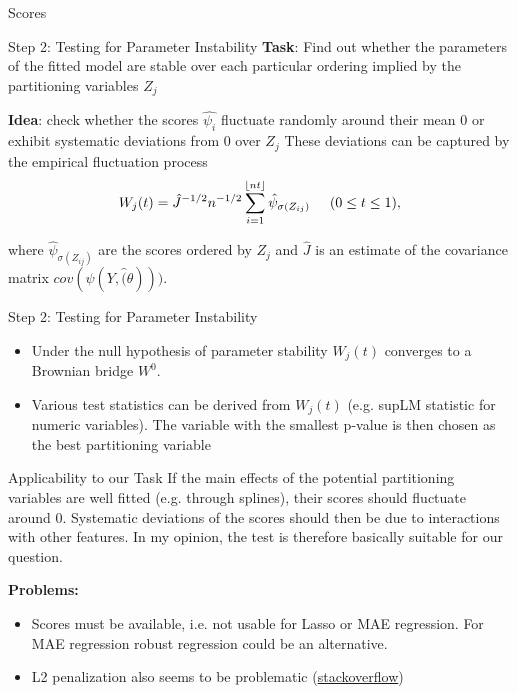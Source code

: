 \documentclass[9pt, xcolor=table]{beamer}
\begin{document}
\begin{frame}{Scores}
\end{frame}


\begin{frame}{Step 2: Testing for Parameter Instability}
\textbf{Task}: Find out whether the parameters of the fitted model are stable over each particular ordering implied by the partitioning variables $Z_{j}$ 

\vspace{0.5cm}
\textbf{Idea}: check whether the scores $\hat{\psi_{i}}$ fluctuate randomly around their mean 0 or exhibit systematic deviations from 0 over $Z_{j}$
These deviations can be captured by the empirical fluctuation process
\begin{align}
    W_{j}(t) = \hat{J}^{-1/2}n^{-1/2}\sum_{i = 1}^{\lfloor nt \rfloor} \hat{\psi}_{\sigma(Z_{ij})} \hspace{0.5cm} (0 \leq t \leq 1), 
\end{align}

where $\hat{\psi}_{\sigma(Z_{ij})}$ are the scores ordered by $Z_{j}$ and $\hat{J}$ is an estimate of the covariance matrix $cov(\psi(Y, \hat(\theta)))$.

\end{frame}


\begin{frame}{Step 2: Testing for Parameter Instability}
\begin{itemize}
    \item Under the null hypothesis of parameter stability  $W_{j}(t)$ converges to a Brownian bridge $W^0$. \citep{Zeileis.2007}
    \item Various test statistics can be derived from $W_{j}(t)$ (e.g. supLM statistic for numeric variables).
The variable with the smallest p-value is then chosen as the best partitioning variable
\end{itemize}
    
\end{frame}

\begin{frame}{Applicability to our Task}
If the main effects of the potential partitioning variables are well fitted (e.g. through splines), their scores should fluctuate  around 0. Systematic deviations of the scores should then be due to interactions with other features. In my opinion, the test is therefore basically suitable for our question.

\vspace{0.5cm}

\textbf{Problems:}
\begin{itemize}
    \item Scores must be available, i.e. not usable for Lasso or MAE regression. For MAE regression robust regression could be an alternative.
    \item L2 penalization also seems to be problematic (\href{https://stackoverflow.com/questions/60767810/can-the-mob-function-in-partykit-build-model-trees-using-regularized-linear-mode/60775986##60775986}{stackoverflow})
\end{itemize}
\end{frame}
\end{document}
